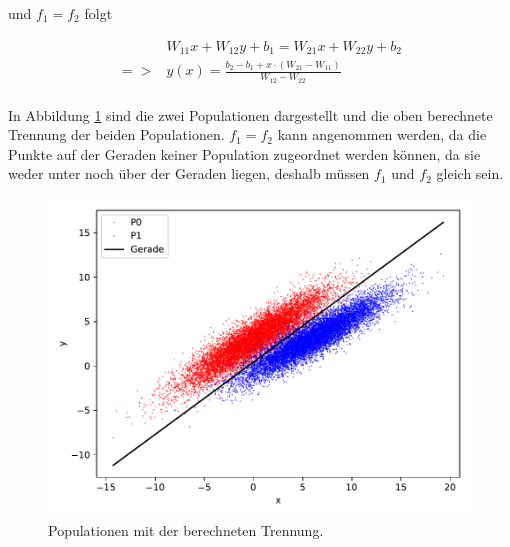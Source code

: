 und $f_1 =f_2$ folgt

\begin{align*}
  & W_{11}x + W_{12}y +b_1 = W_{21}x+ W_{22}y+b_2 \\
  => & y(x)=\frac{b_2-b_1+ x \cdot (W_{21}-W_{11})}{W_{12}-W_{22}} \\
\end{align*}

In Abbildung \ref{abb:1} sind die zwei Populationen dargestellt und die oben
berechnete Trennung der beiden Populationen.
$f_1 = f_2$ kann angenommen werden, da die Punkte auf der Geraden keiner Population
zugeordnet werden können, da sie weder unter noch über der Geraden liegen, deshalb
müssen $f_1$ und $f_2$ gleich sein.
\begin{figure}
  \centering
  \includegraphics[scale=0.9]{Aufgabe21/Plot.pdf}
  \caption{Populationen mit der berechneten Trennung.}
  \label{abb:1}
\end{figure}

